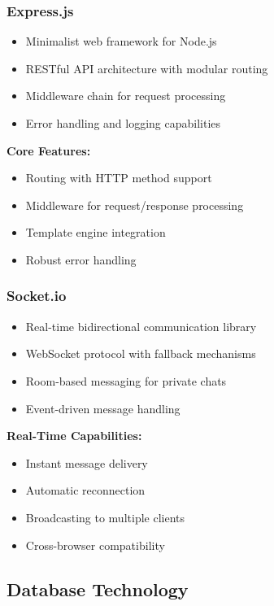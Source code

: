 \documentclass[12pt,a4paper]{article}
\begin{document}
\subsubsection{Express.js}
\begin{itemize}
    \item Minimalist web framework for Node.js
    \item RESTful API architecture with modular routing
    \item Middleware chain for request processing
    \item Error handling and logging capabilities
\end{itemize}

\textbf{Core Features:}
\begin{itemize}
    \item Routing with HTTP method support
    \item Middleware for request/response processing
    \item Template engine integration
    \item Robust error handling
\end{itemize}

\subsubsection{Socket.io}
\begin{itemize}
    \item Real-time bidirectional communication library
    \item WebSocket protocol with fallback mechanisms
    \item Room-based messaging for private chats
    \item Event-driven message handling
\end{itemize}

\textbf{Real-Time Capabilities:}
\begin{itemize}
    \item Instant message delivery
    \item Automatic reconnection
    \item Broadcasting to multiple clients
    \item Cross-browser compatibility
\end{itemize}

\subsection{Database Technology}
\end{document}
